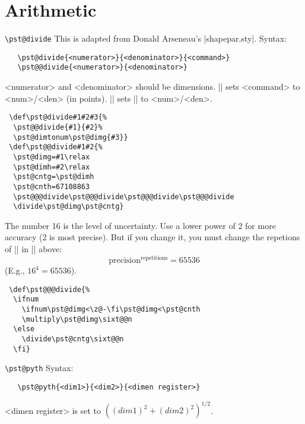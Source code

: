 \documentclass[11pt,english,BCOR10mm,DIV12,bibliography=totoc,parskip=false,smallheadings
    headexclude,footexclude,oneside,dvipsnames,svgnames]{pst-doc}
\begin{document}
\section{Arithmetic}\label{Arithmetic}

 {\verb+\pst@divide+}
 This is adapted from Donald Arseneau's |shapepar.sty|.
 Syntax:
 \begin{verbatim}
   \pst@divide{<numerator>}{<denominator>}{<command>}
   \pst@@divide{<numerator>}{<denominator>}
 \end{verbatim}
 <numerator> and <denominator> should be dimensions. |\pst@divide| sets
 <command> to <num>/<den> (in points). |\pst@@divide| sets |\pst@dimg| to
 <num>/<den>.
    \begin{lstlisting}
 \def\pst@divide#1#2#3{%
  \pst@@divide{#1}{#2}%
  \pst@dimtonum\pst@dimg{#3}}
 \def\pst@@divide#1#2{%
  \pst@dimg=#1\relax
  \pst@dimh=#2\relax
  \pst@cntg=\pst@dimh
  \pst@cnth=67108863
  \pst@@@divide\pst@@@divide\pst@@@divide\pst@@@divide
  \divide\pst@dimg\pst@cntg}
    \end{lstlisting}
 The number 16 is the level of uncertainty. Use a lower power of 2 for more
 accuracy (2 is most precise). But if you change it, you must change the
 repetions of |\pst@@@divide| in |\pst@@divide| above:
 \[
   \mbox{precision}^{\mbox{repetitions}} = 65536
 \]
 (E.g., $16^4 = 65536$).
\begin{lstlisting}
 \def\pst@@@divide{%
  \ifnum
    \ifnum\pst@dimg<\z@-\fi\pst@dimg<\pst@cnth
    \multiply\pst@dimg\sixt@@n
  \else
    \divide\pst@cntg\sixt@@n
  \fi}
\end{lstlisting}

 {\verb+\pst@pyth+}
 Syntax:
 \begin{verbatim}
   \pst@pyth{<dim1>}{<dim2>}{<dimen register>}
 \end{verbatim}
 <dimen register> is set to $((dim1)^2+(dim2)^2)^{1/2}$.
\end{document}
